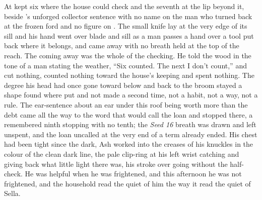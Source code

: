 At   kept six where the house could check and the seventh at the lip beyond it, beside 's unforged collector sentence with no name on the man who turned back at the frozen ford and no figure on . The small knife lay at the very edge of its sill and his hand went over blade and sill as a man passes a hand over a tool put back where it belongs, and came away with no breath held at the top of the reach. The coming away was the whole of the checking. He told the wood in the tone of a man stating the weather, “Six counted. The next I don't count,” and cut nothing, counted nothing toward the house's keeping and spent nothing. The degree his head had once gone toward  below  and back to the broom stayed a shape found where put and not made a second time, not a habit, not a way, not a rule. The ear-sentence about an ear under this roof being worth more than the debt came all the way to the word that would call the loan and stopped there, a remembered ninth stopping with no tenth; the \emph{Seed 16} breath was drawn and left unspent, and the loan uncalled at the very end of a term already ended. His chest had been tight since the dark, Ash worked into the creases of his knuckles in the colour of the clean dark line, the pale clip-ring at his left wrist catching and giving back what little light there was, his stroke over  going without the half-check. He was helpful when he was frightened, and this afternoon he was not frightened, and the household read the quiet of him the way it read the quiet of Sella.

